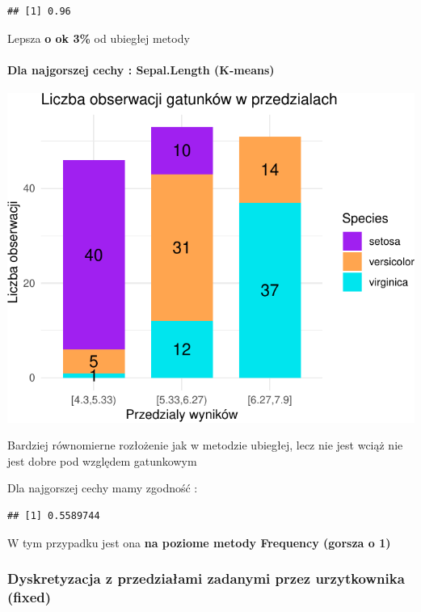 \documentclass[
  12pt,
]{article}
\begin{document}
\begin{verbatim}
## [1] 0.96
\end{verbatim}

Lepsza \textbf{o ok 3\%} od ubiegłej metody

\paragraph{Dla najgorszej cechy : Sepal.Length
(K-means)}\label{dla-najgorszej-cechy-sepal.length-k-means}

\begin{center}\includegraphics{Sprawozdanie2_files/figure-latex/tabela_kondygnacji_3_najg-1} \end{center}

Bardziej równomierne rozłożenie jak w metodzie ubiegłej, lecz nie jest
wciąż nie jest dobre pod względem gatunkowym

Dla najgorszej cechy mamy zgodność :

\begin{verbatim}
## [1] 0.5589744
\end{verbatim}

W tym przypadku jest ona \textbf{na poziome metody Frequency (gorsza o
1)}

\subsubsection{Dyskretyzacja z przedziałami zadanymi przez urzytkownika
(fixed)}\label{dyskretyzacja-z-przedziaux142ami-zadanymi-przez-urzytkownika-fixed}
\end{document}
